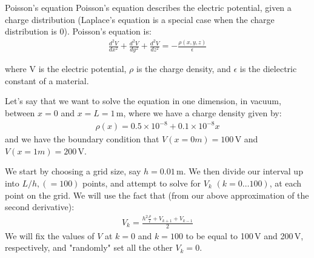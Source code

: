 \begin{example}{0pt}{Poisson's equation}{}
Poisson's equation describes the electric potential, given a charge distribution (Laplace's equation is a special case when the charge distribution is 0). Poisson's equation is:
\begin{align*}
\frac{d^2V}{dx^2}+\frac{d^2V}{dy^2}+\frac{d^2V}{dz^2}=-\frac{\rho(x,y,z)}{\epsilon} 
\end{align*}

where V is the electric potential, $\rho$ is the charge density, and $\epsilon$ is the dielectric constant of a material.

Let's say that we want to solve the equation in one dimension, in vacuum, between $x=0$ and $x=L=1$\,m, where we have a charge density given by:
\begin{align*}
 \rho(x) = 0.5\times 10^{-8}+0.1\times 10^{-8}x 
\end{align*}
and we have the boundary condition that $V(x=0m)=100$\,V and $V(x=1m)=200$\,V.

We start by choosing a grid size, say $h=0.01$\,m. We then divide our interval up into $L/h, (=100)$ points, and attempt to solve for $V_k$ $(k=0\dots 100)$, at each point on the grid. We will use the fact that (from our above approximation of the second derivative):
\begin{align*}
 V_k = \frac{h^2\frac{\rho}{\epsilon}+V_{k+1}+V_{k-1}}{2} 
\end{align*}
We will fix the values of $V$ at $k=0$ and $k=100$ to be equal to 100\,V and 200\,V, respectively, and "randomly" set all the other $V_k = 0$.


\end{example}
